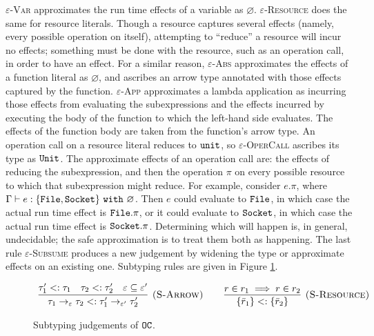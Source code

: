 \textsc{$\varepsilon$-Var} approximates the run time effects of a variable as $\varnothing$. \textsc{$\varepsilon$-Resource} does the same for resource literals. Though a resource captures several effects (namely, every possible operation on itself), attempting to ``reduce'' a resource will incur no effects; something must be done with the resource, such as an operation call, in order to have an effect. For a similar reason, \textsc{$\varepsilon$-Abs} approximates the effects of a function literal as $\varnothing$, and ascribes an arrow type annotated with those effects captured by the function. \textsc{$\varepsilon$-App} approximates a lambda application as incurring those effects from evaluating the subexpressions and the effects incurred by executing the body of the function to which the left-hand side evaluates. The effects of the function body are taken from the function's arrow type. An operation call on a resource literal reduces to $\mathtt{unit}$, so \textsc{$\varepsilon$-OperCall} ascribes its type as $\mathtt{Unit}$.
The approximate effects of an operation call are: the effects of reducing the subexpression, and then the operation $\pi$ on every possible resource
to which that subexpression might reduce. For example, consider $e.\pi$, where $\Gamma \vdash e: \{ \mathtt{File, Socket} \}~\mathtt{with}~ \varnothing$. Then $e$ could evaluate to $\mathtt{File}$, in which case the actual run time effect is $\mathtt{File}.\pi$, or it could evaluate to $\mathtt{Socket}$, in which case the actual run time effect is $\mathtt{Socket.\pi}$. Determining which will happen is, in general, undecidable; the safe approximation is to treat them both as happening. The last rule \textsc{$\varepsilon$-Subsume} produces a new judgement by widening the type or approximate effects on an existing one. Subtyping rules are given in Figure \ref{fig:opercalc_subtype_rules}.


\begin{figure}[h]
\vspace{-5pt}

\fbox{$\tau <: \tau$}

\[
\begin{array}{c}

\infer[\textsc{(S-Arrow)}]
	{ \tau_1 \rightarrow_{\varepsilon} \tau_2 <: \tau_1' \rightarrow_{\varepsilon'} \tau_2' }
	{ \tau_1' <: \tau_1 & \tau_2 <: \tau_2' & \varepsilon \subseteq \varepsilon' }
	\hspace{5ex}
\infer[\textsc{(S-Resource)}]
	{ \{ \bar r_1 \} <: \{ \bar r_2 \} }
	{ r \in r_1 \implies r \in r_2 }

\end{array}
\]

\vspace{-7pt}
\caption{Subtyping judgements of $\mathtt{OC}$.}
\label{fig:opercalc_subtype_rules}
\end{figure}


